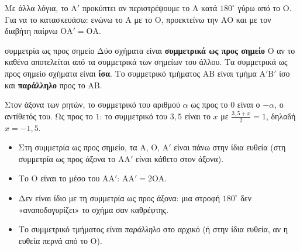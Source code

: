 Με άλλα λόγια, το $\mathrm{Α}'$ προκύπτει αν περιστρέψουμε το $\mathrm{Α}$ κατά $180^\circ$ γύρω από το $\mathrm{Ο}$. Για να το κατασκευάσω: ενώνω το $\mathrm{Α}$ με το $\mathrm{Ο}$, προεκτείνω την $\mathrm{ΑΟ}$ και με τον διαβήτη παίρνω $\mathrm{ΟΑ}'=\mathrm{ΟΑ}$.

\begin{center}
\end{center}

\begin{kanonas}{συμμετρία ως προς σημείο}
Δύο σχήματα είναι \textbf{συμμετρικά ως προς σημείο} $\mathrm{Ο}$ αν το καθένα αποτελείται από τα συμμετρικά των σημείων του άλλου. Τα συμμετρικά ως προς σημείο σχήματα είναι \textbf{ίσα}. Το συμμετρικό τμήματος $\mathrm{ΑΒ}$ είναι τμήμα $\mathrm{Α}'\mathrm{Β}'$ ίσο και \textbf{παράλληλο} προς το $\mathrm{ΑΒ}$.
\end{kanonas}

Στον άξονα των ρητών, το συμμετρικό του αριθμού $\alpha$ ως προς το $0$ είναι ο $-\alpha$, ο αντίθετός του. Ως προς το $1$: το συμμετρικό του $3{,}5$ είναι το $x$ με $\frac{3{,}5+x}{2}=1$, δηλαδή $x=-1{,}5$.

\begin{prosoxi}
\begin{itemize}[leftmargin=1.2em,itemsep=0.3ex,topsep=2pt]
\item Στη συμμετρία ως προς σημείο, τα $\mathrm{Α}$, $\mathrm{Ο}$, $\mathrm{Α}'$ είναι πάνω στην ίδια ευθεία (στη συμμετρία ως προς άξονα το $\mathrm{ΑΑ}'$ είναι κάθετο στον άξονα).
\item Το $\mathrm{Ο}$ είναι το μέσο του $\mathrm{ΑΑ}'$: $\mathrm{ΑΑ}'=2\mathrm{ΟΑ}$.
\item Δεν είναι ίδιο με τη συμμετρία ως προς άξονα: μια στροφή $180^\circ$ δεν «αναποδογυρίζει» το σχήμα σαν καθρέφτης.
\item Το συμμετρικό τμήματος είναι \emph{παράλληλο} στο αρχικό (ή στην ίδια ευθεία, αν η ευθεία περνά από το $\mathrm{Ο}$).
\end{itemize}
\end{prosoxi}

